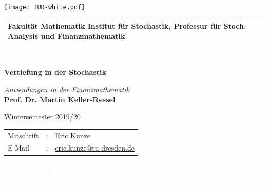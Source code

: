 \documentclass[ngerman, a4paper, 11pt]{report}
\theoremstyle{plain}
\theoremstyle{plain}
\theoremstyle{plain}
\theoremstyle{nonumberplain}
\theoremstyle{proofstyle}
\begin{document}
	
	\begin{titlepage}
		\pagecolor{cddarkblue!90}
		\color{white}
		
		\raggedright
		\fosfamily
		\setlength{\parindent}{0pt}
		
		\hspace{-18.6mm} %
		\texttt{[image: TUD-white.pdf]} \\
		
		\vspace{3mm}
		\begin{tabular}{m{\textwidth}}
			\hline
			\hspace{-4pt}\small{\textbf{Fakultät Mathematik} Institut für Stochastik, Professur für Stoch. Analysis und Finanzmathematik} \\
			\hline
		\end{tabular} \\
		
		\vspace{5cm}
		{\Huge\bfseries \MakeUppercase Vertiefung in der Stochastik \par}
		\vspace{0.5cm}%
		{\Large \itshape Anwendungen in der Finanzmathematik} \\
		\vspace{1.5cm}
		\textbf{{\Large Prof. Dr. Martin Keller-Ressel}} \par
		\vspace{0.5cm}
		{\large Wintersemester 2019/20}
		
		\vfill
		\begin{minipage}{\dimexpr0.75\linewidth-\fboxrule-\fboxsep}
			\begin{tabular}{lll}
				Mitschrift  & : & Eric Kunze \\
				E-Mail      & : & \href{mailto:eric.kunze@tu-dresden.de}{eric.kunze@tu-dresden.de} \\
			\end{tabular}
		\end{minipage}
		\begin{minipage}{\dimexpr0.25\linewidth-\fboxrule-\fboxsep}
			\flushright
			\href{https://github.com/oakoneric/skript-finanzmathe1}{%
				\includegraphics[width=8em]{img/GitHub-Logo-White.png}%
			}
		\end{minipage}
	\end{titlepage}
	\nopagecolor
\end{document}
